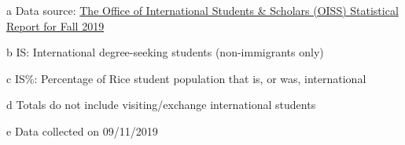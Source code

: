 \documentclass[10pt]{extarticle}
\theoremstyle{theorem}
\theoremstyle{lemma}
\theoremstyle{proposition}
\theoremstyle{corollary}
\theoremstyle{assumption}
\theoremstyle{model}
\theoremstyle{property}
\theoremstyle{example}
\theoremstyle{algorithm}
\theoremstyle{definition}
\theoremstyle{axiom}
\theoremstyle{remark}
\begin{document}
\begin{ThreePartTable}

\begin{TableNotes}
  \footnotesize
      \item [a] Data source: \href{https://oiss.rice.edu/sites/g/files/bxs1291/f/StatReport2019-Public-Version.pdf}{The Office of International Students \& Scholars (OISS) Statistical Report for Fall 2019}
      \item [b] IS: International degree-seeking students (non-immigrants only)
      \item [c] IS\%: Percentage of Rice student population that is, or was, international
      \item [d] Totals do not include visiting/exchange international students
      \item [e] Data collected on 09/11/2019 
\end{TableNotes}


\end{ThreePartTable}
\end{document}
